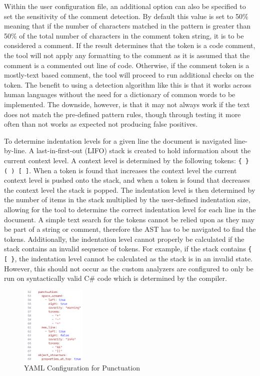 Within the user configuration file, an additional option can also be specified to set the sensitivity of the comment detection. By default this value is set to 50\% meaning that if the number of characters matched in the pattern is greater than 50\% of the total number of characters in the comment token string, it is to be considered a comment. If the result determines that the token is a code comment, the tool will not apply any formatting to the comment as it is assumed that the comment is a commented out line of code. Otherwise, if the comment token is a mostly-text based comment, the tool will proceed to run additional checks on the token. The benefit to using a detection algorithm like this is that it works across human languages without the need for a dictionary of common words to be implemented. The downside, however, is that it may not always work if the text does not match the pre-defined pattern rules, though through testing it more often than not works as expected not producing false positives.

To determine indentation levels for a given line the document is navigated line-by-line. A last-in-first-out (LIFO) stack is created to hold information about the current context level. A context level is determined by the following tokens: \texttt{\{ \} ( ) [ ]}. When a token is found that increases the context level the current context level is pushed onto the stack, and when a token is found that decreases the context level the stack is popped. The indentation level is then determined by the number of items in the stack multiplied by the user-defined indentation size, allowing for the tool to determine the correct indentation level for each line in the document.
A simple text search for the tokens cannot be relied upon as they may be part of a string or comment, therefore the AST has to be navigated to find the tokens. Additionally, the indentation level cannot properly be calculated if the stack contains an invalid sequence of tokens. For example, if the stack contains \texttt{\{ [ \}}, the indentation level cannot be calculated as the stack is in an invalid state. However, this should not occur as the custom analyzers are configured to only be run on syntactically valid C\# code which is determined by the compiler.


\begin{figure}
    \centering
    \caption{YAML Configuration for Punctuation}
    \label{fig:YAMLPunctuation}
    \includegraphics[width=0.275\textwidth]{Figures/YAMLConfigurationPunctuation.png}
\end{figure}


